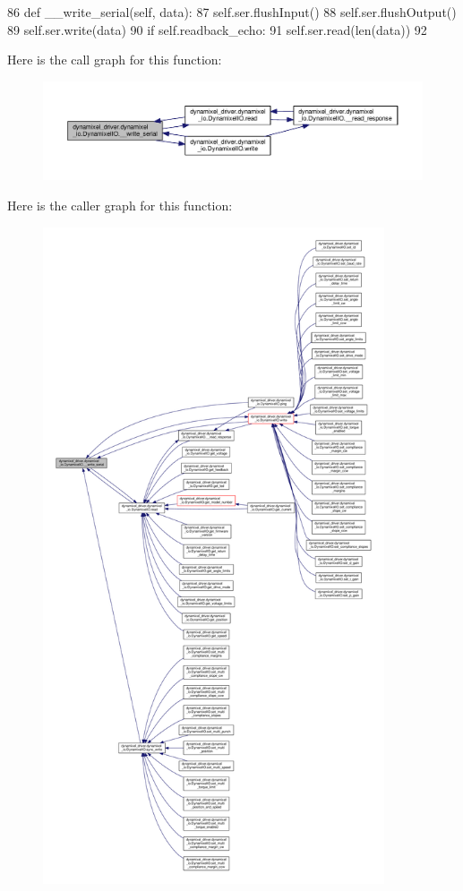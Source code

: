 \begin{DoxyCode}
86     \textcolor{keyword}{def }\_\_write\_serial(self, data):
87         self.ser.flushInput()
88         self.ser.flushOutput()
89         self.ser.write(data)
90         \textcolor{keywordflow}{if} self.readback\_echo:
91             self.ser.read(len(data))
92 
\end{DoxyCode}
Here is the call graph for this function\+:
\nopagebreak
\begin{figure}[H]
\begin{center}
\leavevmode
\includegraphics[width=350pt]{dd/d77/classdynamixel__driver_1_1dynamixel__io_1_1_dynamixel_i_o_a6fb06ef65f812dccf51f320618892a1b_cgraph}
\end{center}
\end{figure}
Here is the caller graph for this function\+:
\nopagebreak
\begin{figure}[H]
\begin{center}
\leavevmode
\includegraphics[height=550pt]{dd/d77/classdynamixel__driver_1_1dynamixel__io_1_1_dynamixel_i_o_a6fb06ef65f812dccf51f320618892a1b_icgraph}
\end{center}
\end{figure}
